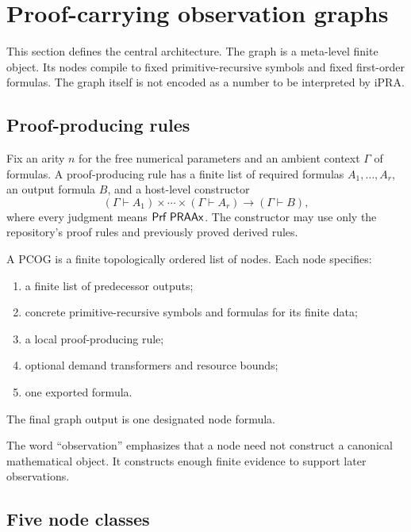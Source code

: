 \section{Proof-carrying observation graphs}
\label{sec:pcog}

This section defines the central architecture.  The graph is a meta-level
finite object.  Its nodes compile to fixed primitive-recursive symbols and
fixed first-order formulas.  The graph itself is not encoded as a number to be
interpreted by iPRA.

\subsection{Proof-producing rules}

Fix an arity \(n\) for the free numerical parameters and an ambient context
\(\Gamma\) of formulas.  A proof-producing rule has a finite list of required
formulas \(A_1,\ldots,A_r\), an output formula \(B\), and a host-level
constructor
\[
  (\Gamma\vdash A_1)\times\cdots\times(\Gamma\vdash A_r)
  \longrightarrow (\Gamma\vdash B),
\]
where every judgment means \(\mathsf{Prf}\;\mathsf{PRAAx}\).  The constructor may use only the
repository's proof rules and previously proved derived rules.

\begin{definition}
A PCOG is a finite topologically ordered list of nodes.  Each node specifies:
\begin{enumerate}
\item a finite list of predecessor outputs;
\item concrete primitive-recursive symbols and formulas for its finite data;
\item a local proof-producing rule;
\item optional demand transformers and resource bounds;
\item one exported formula.
\end{enumerate}
The final graph output is one designated node formula.
\end{definition}

The word ``observation'' emphasizes that a node need not construct a canonical
mathematical object.  It constructs enough finite evidence to support later
observations.

\subsection{Five node classes}

